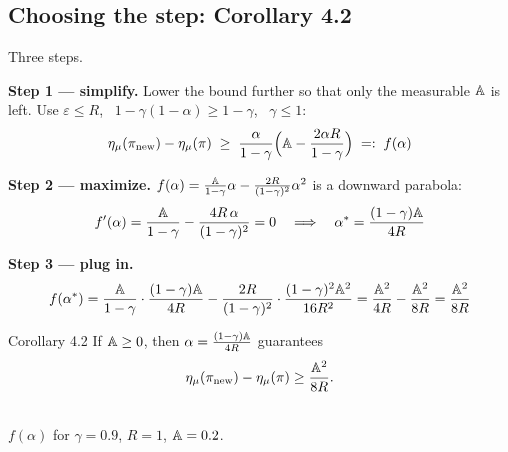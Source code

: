 \subsection{Choosing the step: Corollary 4.2}

Three steps.

\textbf{Step 1 --- simplify.} Lower the bound further so that only the measurable $\mathbb{A}$ is left. Use $\varepsilon\le R$, \ $1-\gamma(1-\alpha)\ge1-\gamma$, \ $\gamma\le1$:
\begin{gather*}
  \eta_\mu(\pi_{\mathrm{new}})-\eta_\mu(\pi) \;\ge\; \frac{\alpha}{1-\gamma}\Big(\mathbb{A} - \frac{2\alpha R}{1-\gamma}\Big) \;=:\; f(\alpha)
\end{gather*}

\textbf{Step 2 --- maximize.} $f(\alpha)=\frac{\mathbb{A}}{1-\gamma}\alpha-\frac{2R}{(1-\gamma)^2}\alpha^2$ is a downward parabola:
\begin{gather*}
  f'(\alpha) = \frac{\mathbb{A}}{1-\gamma} - \frac{4R\,\alpha}{(1-\gamma)^2} = 0
  \quad\Longrightarrow\quad
  \alpha^* = \frac{(1-\gamma)\mathbb{A}}{4R}
\end{gather*}

\textbf{Step 3 --- plug in.}
\begin{gather*}
  f(\alpha^*) = \frac{\mathbb{A}}{1-\gamma}\cdot\frac{(1-\gamma)\mathbb{A}}{4R} - \frac{2R}{(1-\gamma)^2}\cdot\frac{(1-\gamma)^2\mathbb{A}^2}{16R^2}
  = \frac{\mathbb{A}^2}{4R}-\frac{\mathbb{A}^2}{8R} = \frac{\mathbb{A}^2}{8R}
\end{gather*}

\begin{minipage}[c]{0.48\linewidth}
\begin{thmbox}{Corollary 4.2}
If $\mathbb{A}\ge0$, then $\alpha=\frac{(1-\gamma)\mathbb{A}}{4R}$ guarantees
\begin{gather*}
  \eta_\mu(\pi_{\mathrm{new}})-\eta_\mu(\pi)\ge\frac{\mathbb{A}^2}{8R}.
\end{gather*}
\end{thmbox}
\end{minipage}\hfill
\begin{minipage}[c]{0.48\linewidth}
\centering
{}\\
{\scriptsize $f(\alpha)$ for $\gamma=0.9$, $R=1$, $\mathbb{A}=0.2$.}
\end{minipage}

